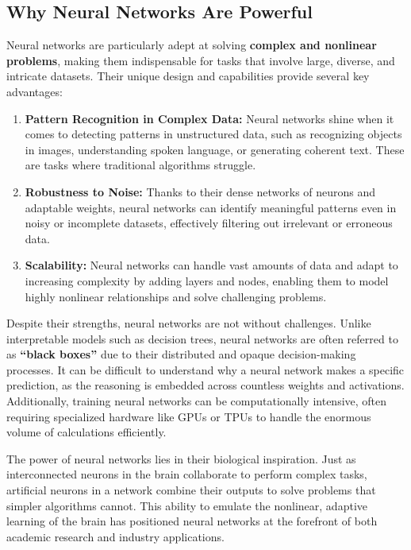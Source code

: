 \documentclass[
]{book}
\providecommand{\tightlist}{%
  \setlength{\itemsep}{0pt}\setlength{\parskip}{0pt}}
\theoremstyle{definition}
\theoremstyle{definition}
\theoremstyle{definition}
\theoremstyle{definition}
\theoremstyle{remark}
\begin{document}
\subsection*{Why Neural Networks Are Powerful}\label{why-neural-networks-are-powerful}

Neural networks are particularly adept at solving \textbf{complex and nonlinear problems}, making them indispensable for tasks that involve large, diverse, and intricate datasets. Their unique design and capabilities provide several key advantages:

\begin{enumerate}
\def\labelenumi{\arabic{enumi}.}
\tightlist
\item
  \textbf{Pattern Recognition in Complex Data:} Neural networks shine when it comes to detecting patterns in unstructured data, such as recognizing objects in images, understanding spoken language, or generating coherent text. These are tasks where traditional algorithms struggle.\\
\item
  \textbf{Robustness to Noise:} Thanks to their dense networks of neurons and adaptable weights, neural networks can identify meaningful patterns even in noisy or incomplete datasets, effectively filtering out irrelevant or erroneous data.\\
\item
  \textbf{Scalability:} Neural networks can handle vast amounts of data and adapt to increasing complexity by adding layers and nodes, enabling them to model highly nonlinear relationships and solve challenging problems.
\end{enumerate}

Despite their strengths, neural networks are not without challenges. Unlike interpretable models such as decision trees, neural networks are often referred to as \textbf{``black boxes''} due to their distributed and opaque decision-making processes. It can be difficult to understand why a neural network makes a specific prediction, as the reasoning is embedded across countless weights and activations. Additionally, training neural networks can be computationally intensive, often requiring specialized hardware like GPUs or TPUs to handle the enormous volume of calculations efficiently.

The power of neural networks lies in their biological inspiration. Just as interconnected neurons in the brain collaborate to perform complex tasks, artificial neurons in a network combine their outputs to solve problems that simpler algorithms cannot. This ability to emulate the nonlinear, adaptive learning of the brain has positioned neural networks at the forefront of both academic research and industry applications.
\end{document}
